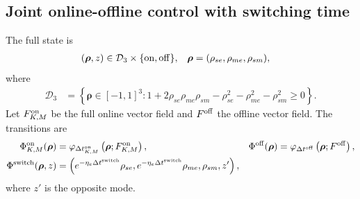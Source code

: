 \documentclass{article}
\begin{document}
\subsection{Joint online-offline control with switching time}

The full state is
\begin{align}
(\boldsymbol\rho,z) &\in \mathcal D_3\times\{{\rm on},{\rm off}\}, & \boldsymbol\rho &= (\rho_{se},\rho_{me},\rho_{sm}),
\end{align}
where
\begin{align}
\mathcal D_3 &= \left\{\boldsymbol\rho\in[-1,1]^3:1+2\rho_{se}\rho_{me}\rho_{sm}-\rho_{se}^2-\rho_{me}^2-\rho_{sm}^2\geq0\right\}.
\end{align}
Let $F_{K,M}^{\rm on}$ be the full online vector field and $F^{\rm off}$ the offline vector field. The transitions are
\begin{align}
\Phi_{K,M}^{\rm on}(\boldsymbol\rho) &= \varphi_{\Delta t_{K,M}^{\rm on}}\left(\boldsymbol\rho;F_{K,M}^{\rm on}\right), & \Phi^{\rm off}(\boldsymbol\rho) &= \varphi_{\Delta t^{\rm off}}\left(\boldsymbol\rho;F^{\rm off}\right), \\
\Phi^{\rm switch}(\boldsymbol\rho,z) &= \left(e^{-\eta_e\Delta t^{\rm switch}}\rho_{se},e^{-\eta_e\Delta t^{\rm switch}}\rho_{me},\rho_{sm},z'\right),
\end{align}
where $z'$ is the opposite mode.
\end{document}
